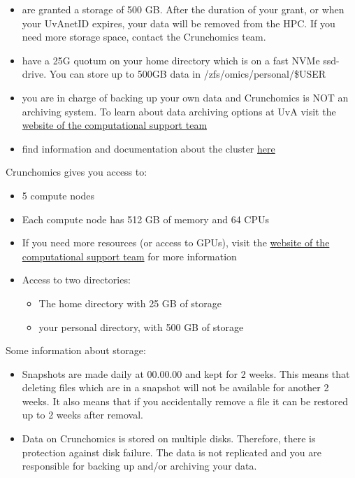 \documentclass[
  letterpaper,
  DIV=11,
  numbers=noendperiod]{scrreprt}
\providecommand{\tightlist}{%
  \setlength{\itemsep}{0pt}\setlength{\parskip}{0pt}}\usepackage{longtable,booktabs,array}
\begin{document}
\begin{itemize}
\tightlist
\item
  are granted a storage of 500 GB. After the duration of your grant, or
  when your UvAnetID expires, your data will be removed from the HPC. If
  you need more storage space, contact the Crunchomics team.
\item
  have a 25G quotum on your home directory which is on a fast NVMe
  ssd-drive. You can store up to 500GB data in
  /zfs/omics/personal/\$USER
\item
  you are in charge of backing up your own data and Crunchomics is NOT
  an archiving system. To learn about data archiving options at UvA
  visit the
  \href{https://ibed.uva.nl/facilities/computational-facilities/ibed-computational-support-team/ibed-computational-support-team.html}{website
  of the computational support team}
\item
  find information and documentation about the cluster
  \href{https://crunchomics-documentation.readthedocs.io/en/latest}{here}
\end{itemize}

Crunchomics gives you access to:

\begin{itemize}
\tightlist
\item
  5 compute nodes
\item
  Each compute node has 512 GB of memory and 64 CPUs
\item
  If you need more resources (or access to GPUs), visit the
  \href{https://ibed.uva.nl/facilities/computational-facilities/ibed-computational-support-team/ibed-computational-support-team.html}{website
  of the computational support team} for more information
\item
  Access to two directories:

  \begin{itemize}
  \tightlist
  \item
    The home directory with 25 GB of storage
  \item
    your personal directory, with 500 GB of storage
  \end{itemize}
\end{itemize}

Some information about storage:

\begin{itemize}
\tightlist
\item
  Snapshots are made daily at 00.00.00 and kept for 2 weeks. This means
  that deleting files which are in a snapshot will not be available for
  another 2 weeks. It also means that if you accidentally remove a file
  it can be restored up to 2 weeks after removal.
\item
  Data on Crunchomics is stored on multiple disks. Therefore, there is
  protection against disk failure. The data is not replicated and you
  are responsible for backing up and/or archiving your data.
\end{itemize}
\end{document}
